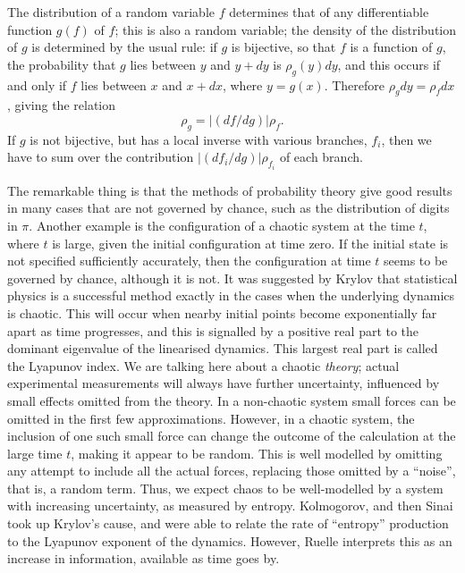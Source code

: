\documentclass[12pt]{article}
\begin{document}
The distribution of a random variable $f$ determines that of any
differentiable function $g(f)$ of $f$; this is also a random variable;
the density of the distribution of $g$ is determined by the usual rule:
if $g$ is bijective, so that $f$ is a function of $g$,
the probability that $g$ lies between $y$ and $y+dy$
is $\rho_g(y)dy$, and this occurs if and only if $f$ lies between $x$
and $x+dx$, where $y=g(x)$. Therefore $\rho_gdy=\rho_fdx$, giving the
relation
\begin{equation}
\rho_g=|(df/dg)|\rho_f.
\label{change}
\end{equation}
If $g$ is not bijective, but has a local inverse with various branches,
$f_i$, then we have to sum over the contribution $|(df_i/dg)|\rho_{f_i}$
of each branch.


The remarkable thing is that the methods of probability theory give good
results in many cases that are not governed by chance, such as the
distribution of digits in $\pi$. Another example is the
configuration of a chaotic system at the time $t$, where $t$ is large,
given the initial configuration at time zero. If the initial
state is not specified sufficiently accurately, then the configuration at
time $t$ seems to be governed by chance, although it is not.
It was suggested by Krylov \cite{Krylov} that statistical physics is a
successful method exactly in the cases when the underlying
dynamics is chaotic. This will occur when nearby initial points
become exponentially far apart as time progresses, and this is signalled by
a positive
real part to the dominant eigenvalue of the linearised dynamics.
This largest real part is called the Lyapunov index.
We are talking here about a chaotic {\em theory};
actual experimental measurements will always have further uncertainty,
influenced by small
effects omitted from the theory. In a non-chaotic system small
forces can be omitted in the first few approximations. However, in a
chaotic system, the inclusion of one such small force can change the
outcome of the calculation at the large time $t$, making it appear to
be random. This is well modelled by omitting any attempt to include all
the actual forces, replacing those omitted by a ``noise'', that is, a
random term. Thus, we expect chaos to be well-modelled by a system with
increasing uncertainty, as measured by entropy. Kolmogorov, and then
Sinai took up Krylov's cause, and were able to relate the rate of
``entropy'' production to the Lyapunov exponent of the dynamics.
However, Ruelle interprets this 
\cite{Ruelle} as an increase in information, available as time goes by.
\end{document}
